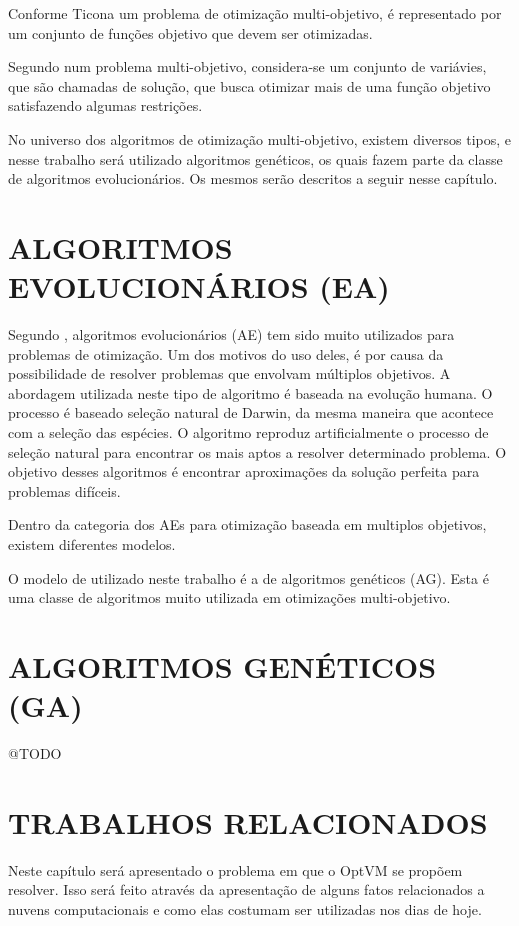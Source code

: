 Conforme Ticona \cite{ticona} um problema de otimização multi-objetivo, é representado por um 
conjunto de funções objetivo que devem ser otimizadas. 

Segundo \cite{Hashimoto} num problema multi-objetivo, considera-se um conjunto de 
variávies, que são chamadas de solução, que busca otimizar mais de uma função objetivo 
satisfazendo algumas restrições. 

No universo dos algoritmos de otimização multi-objetivo, existem diversos tipos, e nesse trabalho
será utilizado algoritmos genéticos, os quais fazem parte da classe de algoritmos evolucionários.
Os mesmos serão descritos a seguir nesse capítulo.
 
\section{ALGORITMOS EVOLUCIONÁRIOS (EA)}
Segundo \cite{ticona}, algoritmos evolucionários (AE) tem sido muito utilizados para problemas de 
otimização. Um dos motivos do uso deles, é por causa da possibilidade de resolver problemas que 
envolvam múltiplos objetivos. A abordagem utilizada neste tipo de algoritmo é baseada na 
evolução humana. O processo é baseado seleção natural de Darwin, da mesma maneira que acontece com a 
seleção das espécies. O algoritmo reproduz artificialmente o processo de seleção natural para 
encontrar os mais aptos a resolver determinado problema. O objetivo desses algoritmos é 
encontrar aproximações da solução perfeita para problemas difíceis. 

Dentro da categoria dos AEs para otimização baseada em multiplos objetivos, existem diferentes modelos. 

O modelo de utilizado neste trabalho é a de algoritmos genéticos (AG). Esta é uma classe de 
algoritmos muito utilizada em otimizações multi-objetivo. 

\section{ALGORITMOS GENÉTICOS (GA)}
@TODO

\section{TRABALHOS RELACIONADOS}
Neste capítulo será apresentado o problema em que o OptVM se propõem resolver. 
Isso será feito através da apresentação de alguns fatos relacionados a nuvens computacionais 
e como elas costumam ser utilizadas nos dias de hoje.

